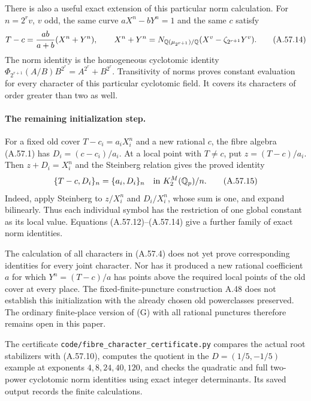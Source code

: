 There is also a useful exact extension of this
particular norm calculation. For $n=2^r v$, $v$ odd,
the same curve $aX^n-bY^n=1$ and the same $c$
satisfy
\[
 T-c=\frac{ab}{a+b}(X^n+Y^n),\qquad
 X^n+Y^n=
 N_{\mathbb Q(\mu_{2^{r+1}})/\mathbb Q}
                  (X^v-\zeta_{2^{r+1}}Y^v).
 \tag{A.57.14}
\]
The norm identity is the homogeneous cyclotomic
identity $\Phi_{2^{r+1}}(A/B)B^{2^r}=A^{2^r}+B^{2^r}$.
Transitivity of norms proves constant evaluation
for every character of this particular cyclotomic
field. It covers its characters of order greater
than two as well.

\paragraph{The remaining initialization step.}
For a fixed old cover
$T-c_i=a_iX_i^n$ and a new rational $c$, the
fibre algebra (A.57.1) has
$D_i=(c-c_i)/a_i$.
At a local point with $T\ne c$, put
$z=(T-c)/a_i$. Then $z+D_i=X_i^n$ and the
Steinberg relation gives the proved identity
\[
         \{T-c,D_i\}_n=\{a_i,D_i\}_n
                   \quad\text{in }K_2^M(\mathbb Q_p)/n.
 \tag{A.57.15}
\]
Indeed, apply Steinberg to $z/X_i^n$ and
$D_i/X_i^n$, whose sum is one, and expand
bilinearly. Thus each individual symbol has
the restriction of one global constant as
its local value. Equations (A.57.12)--(A.57.14)
give a further family of exact norm identities.

The calculation of all characters in (A.57.4)
does not yet prove corresponding identities
for every joint character. Nor has it produced
a new rational coefficient $a$ for which
$Y^n=(T-c)/a$ has points above the required
local points of the old cover at every place.
The fixed-finite-puncture construction A.48
does not establish this initialization with
the already chosen old powerclasses preserved.
The ordinary finite-place version of (G) with
all rational punctures therefore remains open
in this paper.

The certificate
\texttt{code/fibre\_character\_certificate.py}
compares the actual root stabilizers with
(A.57.10), computes the quotient in the
$D=(1/5,-1/5)$ example at exponents
$4,8,24,40,120$, and checks the quadratic
and full two-power cyclotomic norm identities
using exact integer determinants.
Its saved output records the finite calculations.
